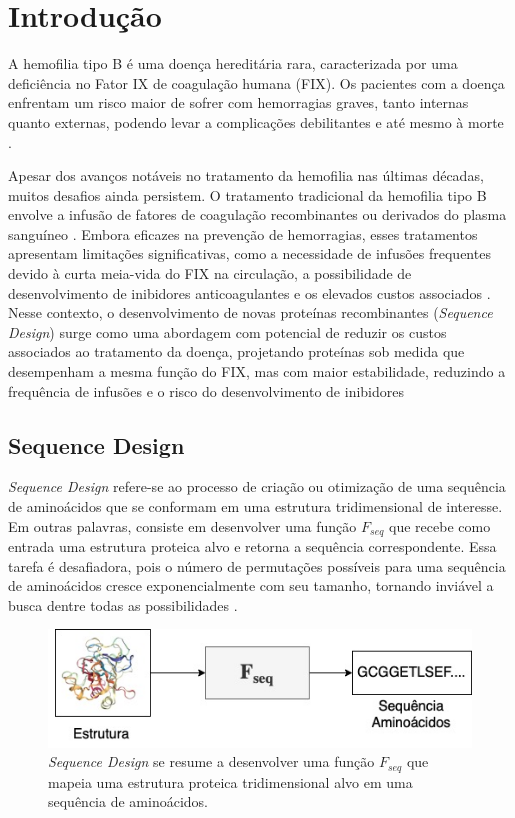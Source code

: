 \chapter{Introdução}
\label{cap:introducao}
\enlargethispage{.5\baselineskip}

A hemofilia tipo B é uma doença hereditária rara, 
caracterizada por uma deficiência no Fator IX de coagulação humana (FIX). 
Os pacientes com a doença enfrentam um risco maior de sofrer com hemorragias graves, 
tanto internas quanto externas, 
podendo levar a complicações debilitantes e até mesmo à morte \cite{Mannucci}.

Apesar dos avanços notáveis no tratamento da hemofilia nas últimas décadas,
muitos desafios ainda persistem.
O tratamento tradicional da hemofilia tipo B envolve a infusão de fatores de coagulação recombinantes
ou derivados do plasma sanguíneo \cite{Gouw}. 
Embora eficazes na prevenção de hemorragias,
esses tratamentos apresentam limitações significativas,
como a necessidade de infusões frequentes devido à curta meia-vida do FIX na circulação,
a possibilidade de desenvolvimento de inibidores anticoagulantes e os elevados custos associados \cite{Mancuso}.
Nesse contexto, o desenvolvimento de novas proteínas recombinantes (\textit{Sequence Design}) surge 
como uma abordagem com potencial de reduzir os custos associados ao tratamento da doença, 
projetando proteínas sob medida que desempenham a mesma função do FIX, mas com maior estabilidade,
reduzindo a frequência de infusões e o risco do desenvolvimento de inibidores

\section{Sequence Design}

\textit{Sequence Design} refere-se ao processo de criação ou
otimização de uma sequência de aminoácidos que se conformam em uma estrutura tridimensional de interesse.
Em outras palavras, consiste em desenvolver uma função $F_{seq}$ que 
recebe como entrada uma estrutura proteica alvo e retorna a sequência correspondente. 
Essa tarefa é desafiadora, 
pois o número de permutações possíveis para uma sequência de aminoácidos
cresce exponencialmente com seu tamanho, 
tornando inviável a busca dentre todas as possibilidades \cite{Overview}.

\begin{figure}[H]
  \caption[\textit{Sequence Design}]{\textit{Sequence Design} se resume a desenvolver uma 
  função $F_{seq}$ que mapeia uma estrutura proteica tridimensional alvo em uma sequência de aminoácidos.}
  \centering
  \includegraphics[width=.8\textwidth]{figuras/metodologia-SeqDes.jpg}
\end{figure}

